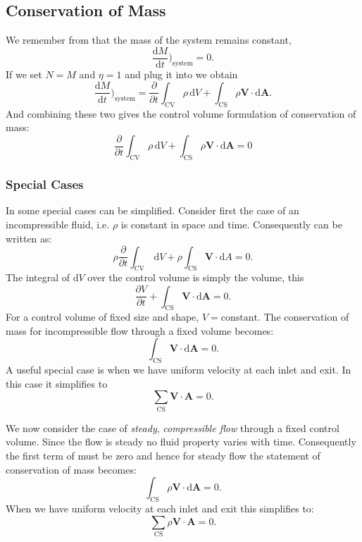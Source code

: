 \subsection{Conservation of Mass}
We remember from  that the mass of the system remains constant,
\[ 
\frac{\mathrm{d}M}{\mathrm{d}t} \bigg)_{\mathrm{system}} = 0
.\]
If we set $N = M$ and $\eta = 1$ and plug it into  we obtain
\[ 
\frac{\mathrm{d}M}{\mathrm{d}t} \bigg)_{\mathrm{system}} = \frac{\partial }{\partial t} \int_{\mathrm{CV}} \rho \, \mathrm{d}V + \int_{\mathrm{CS}} \rho \textbf{V} \cdot \mathrm{d}\textbf{A} 
.\]
And combining these two gives the control volume formulation of conservation of mass:
\begin{equation} \label{eq:convolconmas}
  \frac{\partial}{\partial t} \int_{\mathrm{CV}} \rho \, \mathrm{d}V + \int_{\mathrm{CS}} \rho \textbf{V} \cdot \mathrm{d}\textbf{A} = 0
\end{equation}


\subsubsection{Special Cases}
In some special cases  can be simplified. Consider first the case of an incompressible fluid, i.e. $\rho$ is constant in space and time. Consequently  can be written as:
\[ 
\rho \frac{\partial }{\partial t} \int_{\mathrm{CV}} \, \mathrm{d}V + \rho \int_{\mathrm{CS}} \textbf{V} \cdot \mathrm{d}A = 0
.\]
The integral of $\mathrm{d}V$ over the control volume is simply the volume, this
\[ 
\frac{\partial V}{\partial t} + \int_{\mathrm{CS}} \textbf{V} \cdot \mathrm{d}\textbf{A} = 0
.\]
For a control volume of fixed size and shape, $V = \mathrm{constant}$. The conservation of mass for incompressible flow through a fixed volume becomes:
\[ 
\int_{\mathrm{CS}} \textbf{V} \cdot \mathrm{d}\textbf{A} = 0
.\]
A useful special case is when we have uniform velocity at each inlet and exit. In this case it simplifies to
\[ 
\sum_{\mathrm{CS}} \textbf{V} \cdot \textbf{A} = 0
.\]

We now consider the case of \textit{steady}, \textit{compressible flow} through a fixed control volume. Since the flow is steady no fluid property varies with time. Consequently the first term of  must be zero and hence for steady flow the statement of conservation of mass becomes:
\[ 
\int_{\mathrm{CS}} \rho \textbf{V} \cdot \mathrm{d}\textbf{A} = 0
.\]
When we have uniform velocity at each inlet and exit this simplifies to:
\[ 
\sum_{\mathrm{CS}} \rho \textbf{V} \cdot \textbf{A} = 0
.\]



